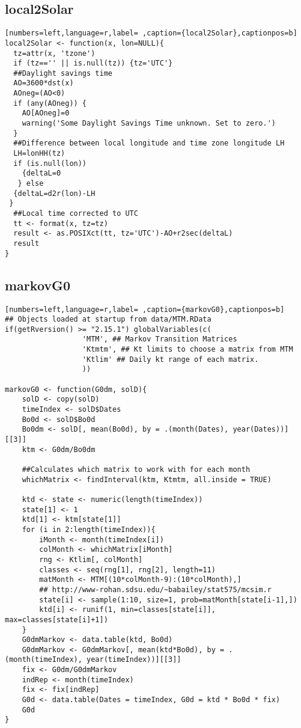 \subsection{local2Solar}
\label{sec:org9ff7ed7}
\label{subsec:local2solar}
\begin{lstlisting}[numbers=left,language=r,label= ,caption={local2Solar},captionpos=b]
local2Solar <- function(x, lon=NULL){	
  tz=attr(x, 'tzone')
  if (tz=='' || is.null(tz)) {tz='UTC'}
  ##Daylight savings time
  AO=3600*dst(x)
  AOneg=(AO<0)
  if (any(AOneg)) {
    AO[AOneg]=0
    warning('Some Daylight Savings Time unknown. Set to zero.')
  }
  ##Difference between local longitude and time zone longitude LH
  LH=lonHH(tz)
  if (is.null(lon)) 
    {deltaL=0
   } else
  {deltaL=d2r(lon)-LH
 }
  ##Local time corrected to UTC
  tt <- format(x, tz=tz)
  result <- as.POSIXct(tt, tz='UTC')-AO+r2sec(deltaL)
  result
}
\end{lstlisting}
\subsection{markovG0}
\label{sec:org15f3e3d}
\label{subsec:markovg0}
\begin{lstlisting}[numbers=left,language=r,label= ,caption={markovG0},captionpos=b]
## Objects loaded at startup from data/MTM.RData
if(getRversion() >= "2.15.1") globalVariables(c(
                  'MTM', ## Markov Transition Matrices
                  'Ktmtm', ## Kt limits to choose a matrix from MTM
                  'Ktlim' ## Daily kt range of each matrix.
                  ))

markovG0 <- function(G0dm, solD){
    solD <- copy(solD)
    timeIndex <- solD$Dates
    Bo0d <- solD$Bo0d
    Bo0dm <- solD[, mean(Bo0d), by = .(month(Dates), year(Dates))][[3]]
    ktm <- G0dm/Bo0dm

    ##Calculates which matrix to work with for each month
    whichMatrix <- findInterval(ktm, Ktmtm, all.inside = TRUE)

    ktd <- state <- numeric(length(timeIndex))
    state[1] <- 1
    ktd[1] <- ktm[state[1]]
    for (i in 2:length(timeIndex)){
        iMonth <- month(timeIndex[i])
        colMonth <- whichMatrix[iMonth]
        rng <- Ktlim[, colMonth]
        classes <- seq(rng[1], rng[2], length=11)
        matMonth <- MTM[(10*colMonth-9):(10*colMonth),]
        ## http://www-rohan.sdsu.edu/~babailey/stat575/mcsim.r
        state[i] <- sample(1:10, size=1, prob=matMonth[state[i-1],])
        ktd[i] <- runif(1, min=classes[state[i]], max=classes[state[i]+1])
    }
    G0dmMarkov <- data.table(ktd, Bo0d)
    G0dmMarkov <- G0dmMarkov[, mean(ktd*Bo0d), by = .(month(timeIndex), year(timeIndex))][[3]]
    fix <- G0dm/G0dmMarkov
    indRep <- month(timeIndex)
    fix <- fix[indRep]
    G0d <- data.table(Dates = timeIndex, G0d = ktd * Bo0d * fix)
    G0d
}
\end{lstlisting}
